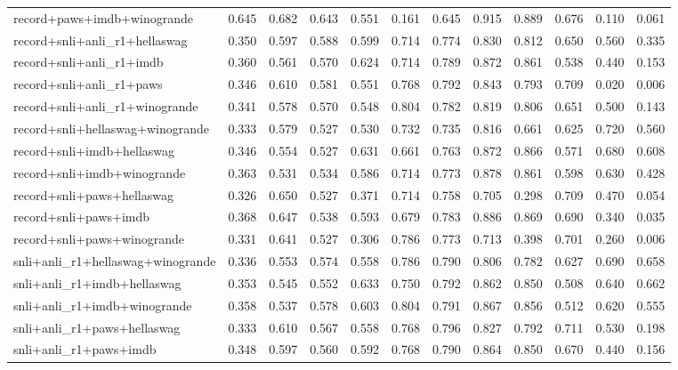 \begin{table}[t]
\begin{tabular}{lrrrrrrrrrrr}
    record+paws+imdb+winogrande & 0.645 & 0.682 & 0.643 & 0.551 & 0.161 & 0.645 & 0.915 & 0.889 & 0.676 & 0.110 & 0.061 \\
    record+snli+anli\_r1+hellaswag & 0.350 & 0.597 & 0.588 & 0.599 & 0.714 & 0.774 & 0.830 & 0.812 & 0.650 & 0.560 & 0.335 \\
    record+snli+anli\_r1+imdb & 0.360 & 0.561 & 0.570 & 0.624 & 0.714 & 0.789 & 0.872 & 0.861 & 0.538 & 0.440 & 0.153 \\
    record+snli+anli\_r1+paws & 0.346 & 0.610 & 0.581 & 0.551 & 0.768 & 0.792 & 0.843 & 0.793 & 0.709 & 0.020 & 0.006 \\
    record+snli+anli\_r1+winogrande & 0.341 & 0.578 & 0.570 & 0.548 & 0.804 & 0.782 & 0.819 & 0.806 & 0.651 & 0.500 & 0.143 \\
    record+snli+hellaswag+winogrande & 0.333 & 0.579 & 0.527 & 0.530 & 0.732 & 0.735 & 0.816 & 0.661 & 0.625 & 0.720 & 0.560 \\
    record+snli+imdb+hellaswag & 0.346 & 0.554 & 0.527 & 0.631 & 0.661 & 0.763 & 0.872 & 0.866 & 0.571 & 0.680 & 0.608 \\
    record+snli+imdb+winogrande & 0.363 & 0.531 & 0.534 & 0.586 & 0.714 & 0.773 & 0.878 & 0.861 & 0.598 & 0.630 & 0.428 \\
    record+snli+paws+hellaswag & 0.326 & 0.650 & 0.527 & 0.371 & 0.714 & 0.758 & 0.705 & 0.298 & 0.709 & 0.470 & 0.054 \\
    record+snli+paws+imdb & 0.368 & 0.647 & 0.538 & 0.593 & 0.679 & 0.783 & 0.886 & 0.869 & 0.690 & 0.340 & 0.035 \\
    record+snli+paws+winogrande & 0.331 & 0.641 & 0.527 & 0.306 & 0.786 & 0.773 & 0.713 & 0.398 & 0.701 & 0.260 & 0.006 \\
    snli+anli\_r1+hellaswag+winogrande & 0.336 & 0.553 & 0.574 & 0.558 & 0.786 & 0.790 & 0.806 & 0.782 & 0.627 & 0.690 & 0.658 \\
    snli+anli\_r1+imdb+hellaswag & 0.353 & 0.545 & 0.552 & 0.633 & 0.750 & 0.792 & 0.862 & 0.850 & 0.508 & 0.640 & 0.662 \\
    snli+anli\_r1+imdb+winogrande & 0.358 & 0.537 & 0.578 & 0.603 & 0.804 & 0.791 & 0.867 & 0.856 & 0.512 & 0.620 & 0.555 \\
    snli+anli\_r1+paws+hellaswag & 0.333 & 0.610 & 0.567 & 0.558 & 0.768 & 0.796 & 0.827 & 0.792 & 0.711 & 0.530 & 0.198 \\
    snli+anli\_r1+paws+imdb & 0.348 & 0.597 & 0.560 & 0.592 & 0.768 & 0.790 & 0.864 & 0.850 & 0.670 & 0.440 & 0.156 \\

\end{tabular}
\end{table}
